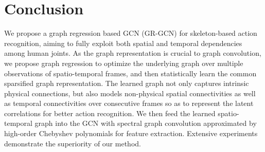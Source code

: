 \documentclass[conference]{IEEEtran}
\begin{document}
\section{Conclusion}
\label{sec:conclude}

We propose a graph regression based GCN (GR-GCN) for skeleton-based action recognition, aiming to fully exploit both spatial and temporal dependencies among human joints. As the graph representation is crucial to graph convolution, we propose graph regression to optimize the underlying graph over multiple observations of spatio-temporal frames, and then statistically learn the common sparsified graph representation. The learned graph not only captures intrinsic physical connections, but also models non-physical spatial connectivities as well as temporal connectivities over consecutive frames so as to represent the latent correlations for better action recognition. We then feed the learned spatio-temporal graph into the GCN with spectral graph convolution approximated by high-order Chebyshev polynomials for feature extraction. Extensive experiments demonstrate the superiority of our method.
\end{document}
